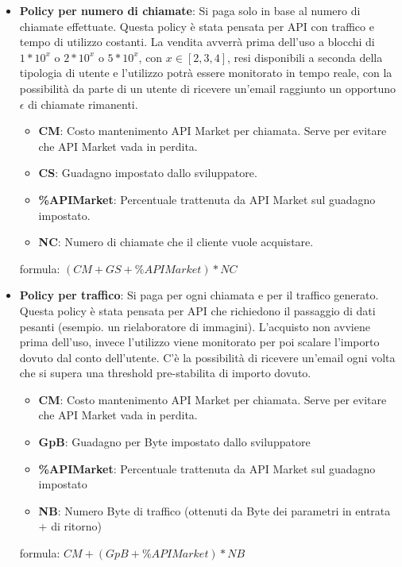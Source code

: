 \begin{itemize}
	\item \textbf{Policy per numero di chiamate}: Si paga solo in base al numero di chiamate effettuate.
Questa policy \`{e} stata pensata per API con traffico e tempo di utilizzo costanti. La vendita avverr\`{a} prima dell'uso a blocchi di $1*10^x$ o $2*10^x$ o $5*10^x$, con $x \in [2,3,4]$, resi disponibili a seconda della tipologia di utente e l'utilizzo potr\`{a} essere monitorato in tempo reale, con la possibilit\`{a} da parte di un utente di ricevere un'email raggiunto un opportuno $\epsilon$ di chiamate rimanenti.
	
	\begin{itemize}
		\item \textbf{CM}: Costo mantenimento API Market per chiamata. Serve per evitare che API Market vada in perdita.
		\item \textbf{CS}: Guadagno impostato dallo sviluppatore.
		\item \textbf{\%APIMarket}: Percentuale trattenuta da API Market sul guadagno impostato.
		\item \textbf{NC}: Numero di chiamate che il cliente vuole acquistare.
	\end{itemize}
	formula: $(CM + GS + \%APIMarket) * NC
$

	\item \textbf{Policy per traffico}: Si paga per ogni chiamata e per il traffico generato.
Questa policy \`{e} stata pensata per API che richiedono il passaggio di dati pesanti (esempio. un rielaboratore di immagini). L'acquisto non avviene prima dell'uso, invece l'utilizzo viene monitorato per poi scalare l'importo dovuto dal conto dell'utente. C'\`{e} la possibilit\`{a} di ricevere un'email ogni volta che si supera una threshold pre-stabilita di importo dovuto.
	
	\begin{itemize}
		\item \textbf{CM}: Costo mantenimento API Market per chiamata. Serve per evitare che API Market vada in perdita.
		\item \textbf{GpB}: Guadagno per Byte impostato dallo sviluppatore
		\item \textbf{\%APIMarket}: Percentuale trattenuta da API Market sul guadagno impostato
		\item \textbf{NB}: Numero Byte di traffico (ottenuti da Byte dei parametri in entrata + di ritorno)
	\end{itemize}
	formula: $CM + (GpB + \%APIMarket) * NB
$
	

\end{itemize}

